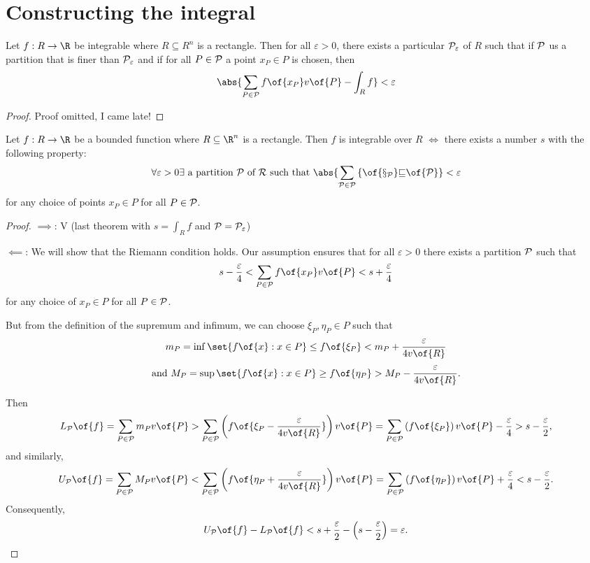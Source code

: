 \chapter{Constructing the integral}

\begin{theorem}
    Let $f: R \to \R$ be integrable where $R \subseteq R^n$ is a rectangle. Then for all $\varepsilon > 0$, there exists a particular $\cal{P}_\varepsilon$ of $R$ such that if $\cal{P}$ us a partition that is finer than $\cal{P}_\varepsilon$ and if for all $P \in \cal{P}$ a point $x_P \in P$ is chosen, then \[\abs{\sum_{P \in \cal{P}} f\of{x_P} v\of{P} - \int_R f} < \varepsilon\]
\end{theorem}
\begin{proof}
    Proof omitted, I came late!
\end{proof}

\begin{theorem}
    Let $f: R \to \R$ be a bounded function where $R \subseteq \R^n$ is a rectangle. Then $f$ is integrable over $R$ $\iff$ there exists a number $s$ with the following property:
    \[\forall \varepsilon > 0 \exists \text{ a partition } \cal{P} \text{ of } R \text{ such that } \abs{\sum_{P \in \cal{P}} f\of{x_P} v\of{P}} < \varepsilon \]
    for any choice of points $x_P \in P$ for all $P \in \cal{P}$.
\end{theorem}
\begin{proof}
    $\implies$: V (last theorem with $s = \int_R f$ and $\cal{P} = \cal{P}_\varepsilon$)

    $\impliedby$: We will show that the Riemann condition holds. Our assumption ensures that for all $\varepsilon > 0$ there exists a partition $\cal{P}$ such that
    \[s - \frac{\varepsilon}{4} < \sum_{P \in \cal{P}} f\of{x_P} v\of{P} < s + \frac{\varepsilon}{4}\]
    for any choice of $x_P \in P$ for all $P \in \cal{P}$.

    But from the definition of the supremum and infimum, we can choose $\xi_P, \eta_P \in P$ such that
    \[m_P = \inf\set{f\of{x}: x \in P} \leq f\of{\xi_P} < m_P + \frac{\varepsilon}{4v\of{R}}\]
    \[\text{and } M_P = \sup\set{f\of{x}: x \in P} \geq f\of{\eta_P} > M_P - \frac{\varepsilon}{4v\of{R}}.\]

    Then
    \[L_{\cal{P}}\of{f} = \sum_{P \in \cal{P}} m_P v\of{P} > \sum_{P \in \cal{P}} \left(f\of{\xi_P - \frac{\varepsilon}{4v\of{R}}}\right)v\of{P} = \sum_{P \in \cal{P}} \left(f\of{\xi_P}\right)v\of{P} - \frac{\varepsilon}{4} > s - \frac{\varepsilon}{2},\]
    and similarly,
    \[U_{\cal{P}}\of{f} = \sum_{P \in \cal{P}} M_P v\of{P} < \sum_{P \in \cal{P}} \left(f\of{\eta_P + \frac{\varepsilon}{4v\of{R}}}\right)v\of{P} = \sum_{P \in \cal{P}} \left(f\of{\eta_P}\right)v\of{P} + \frac{\varepsilon}{4} < s - \frac{\varepsilon}{2}.\]
    Consequently,
    \[U_{\cal{P}}\of{f} - L_{\cal{P}}\of{f} < s + \frac{\varepsilon}{2} - \left(s - \frac{\varepsilon}{2}\right) = \varepsilon.\]
\end{proof}

